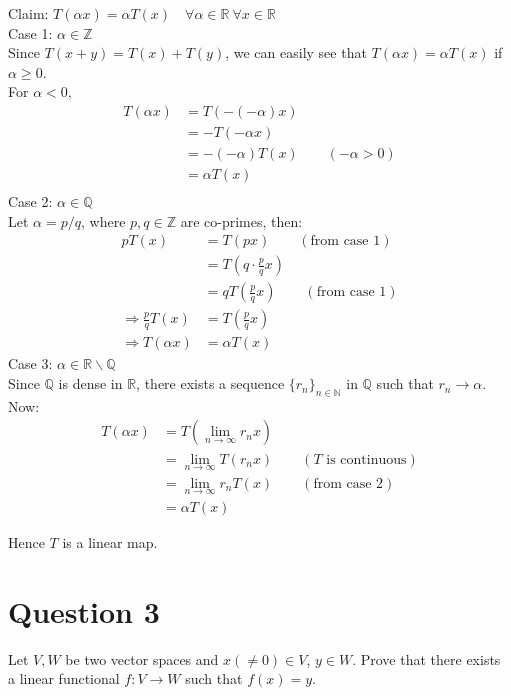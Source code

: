 \documentclass{article}
\begin{document}
	Claim: $T(\alpha x) = \alpha T(x) \quad \forall \alpha \in \mathbb{R} ~
	\forall x \in \mathbb{R}$ \\
	Case 1: $\alpha \in \mathbb{Z}$ \\
	Since $T(x + y) = T(x) + T(y)$, we can easily see that $T(\alpha x) = \alpha T(x)$ if
	$\alpha \ge 0$. \\
	For $\alpha < 0$,
	\begin{align*}
		T(\alpha x) &= T(-(-\alpha) x) \\
		&= -T(-\alpha x) \\
		&= -(-\alpha) T(x) \qquad (-\alpha > 0) \\
		&= \alpha T(x) \\
	\end{align*}
	Case 2: $\alpha \in \mathbb{Q}$ \\
	Let $\alpha = p / q$, where $p, q \in \mathbb{Z}$ are co-primes, then:
	\begin{align*}
		p T(x) &= T(p x) \qquad (\text{from case 1}) \\
		&= T \left(q \cdot \frac{p}{q} x \right) \\
		&= q T \left(\frac{p}{q} x \right) \qquad (\text{from case 1}) \\
		\Rightarrow \frac{p}{q} T(x) &= T \left(\frac{p}{q} x \right) \\
		\Rightarrow T(\alpha x) &= \alpha T(x)
	\end{align*}
	Case 3: $\alpha \in \mathbb{R} \backslash \mathbb{Q}$ \\
	Since $\mathbb{Q}$ is dense in $\mathbb{R}$, there exists a sequence
	$\{r_n\}_{n \in \mathbb{N}}$ in $\mathbb{Q}$ such that $r_n \to \alpha$. \\
	Now:
	\begin{align*}
		T(\alpha x) &= T \left(\lim_{n \to \infty} r_n x \right) \\
		&= \lim_{n \to \infty} T(r_n x) \qquad (T \text{ is continuous}) \\
		&= \lim_{n \to \infty} r_n T(x) \qquad (\text{from case 2}) \\
		&= \alpha T(x)
	\end{align*}

	Hence $T$ is a linear map.

\section{Question 3}

	Let $V, W$ be two vector spaces and $x (\ne 0) \in V$, $y \in W$.
	Prove that there exists a linear functional $f: V \to W$ such that $f(x) = y$. \\
\end{document}

